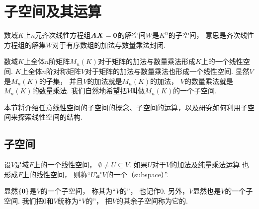 \section{子空间及其运算}
数域\(K\)上\(n\)元齐次线性方程组\(\boldsymbol{A} \boldsymbol{X} = \boldsymbol0\)的解空间\(W\)是\(K^n\)的子空间，
意思是齐次线性方程组的解集\(W\)对于有序数组的加法与数量乘法封闭.

数域\(K\)上全体\(n\)阶矩阵\(M_n(K)\)对于矩阵的加法与数量乘法形成\(K\)上的一个线性空间.
\(K\)上全体\(n\)阶对称矩阵\(V\)对于矩阵的加法与数量乘法也形成一个线性空间.
显然\(V\)是\(M_n(K)\)的子集，
并且\(V\)的加法就是\(M_n(K)\)的加法，
\(V\)的数量乘法就是\(M_n(K)\)的数量乘法.
我们自然地希望把\(V\)叫做\(M_n(K)\)的一个子空间.

本节将介绍任意线性空间的子空间的概念、子空间的运算，以及研究如何利用子空间来探索线性空间的结构.

\subsection{子空间}
\begin{definition}
设\(V\)是域\(F\)上的一个线性空间，
\(\emptyset\neq U\subseteq V\).
如果\(U\)对于\(V\)的加法及纯量乘法运算
也形成\(F\)上的线性空间，
则称“\(U\)是\(V\)的一个（subspace）”.
\end{definition}

显然\(\{\boldsymbol0\}\)是\(V\)的一个子空间，
称其为“\(V\)的”，
也记作\(0\).
另外，\(V\)显然也是\(V\)的一个子空间.
我们把\(0\)和\(V\)统称为“\(V\)的”，
把\(V\)的其余子空间称为它的.

